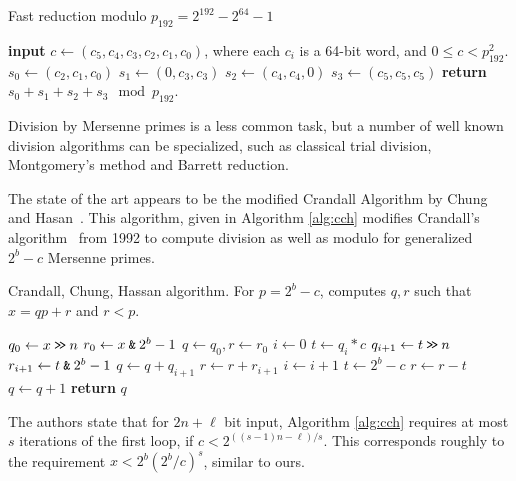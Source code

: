 \begin{algorithm}[H]
   \caption{Fast reduction modulo $p_{192} = 2^{192} - 2^{64} - 1$}
   \label{alg:solina}
   \begin{algorithmic}
      \State \textbf{input} $c \gets (c_5, c_4, c_3, c_2, c_1, c_0)$, where each $c_i$ is a 64-bit word, and $0 \le c < p^2_{192}$.
      \State $s_0 \gets (c_2, c_1, c_0)$
      \State $s_1 \gets (0, c_3, c_3)$
      \State $s_2 \gets (c_4, c_4, 0)$
      \State $s_3 \gets (c_5, c_5, c_5)$
      \State \textbf{return} $s_0 + s_1 + s_2 + s_3 \mod p_{192}$.
   \end{algorithmic}
\end{algorithm}

Division by Mersenne primes is a less common task, but a number of well known division algorithms can be specialized, such as 
 classical trial division, Montgomery's method and Barrett reduction.




The state of the art appears to be the modified Crandall Algorithm by Chung and Hasan~\cite{chung2006low}.
This algorithm, given in Algorithm \ref{alg:cch} modifies Crandall's algorithm~\cite{crandall1992method} from 1992 to compute division as well as modulo for generalized $2^b-c$ Mersenne primes.
\begin{algorithm}[H]
   \caption{Crandall, Chung, Hassan algorithm. For $p=2^b-c$, computes $q, r$ such that $x = qp+r$ and $r<p$.}
   \label{alg:cch}
   \begin{algorithmic}
         \State $q_0 \gets x \mathbin{\texttt{>\!>}} n $
         \State $r_0 \gets x \mathbin{\texttt{\&}} 2^b-1$
         \State $q \gets q_0, r\gets r_0$
         \State $i \gets 0$
            \State $t \gets q_i*c$
            \State $q_{i+1} \gets t \mathbin{\texttt{>\!>}} n$
            \State $r_{i+1} \gets t \mathbin{\texttt{\&}} {2^b -1}$
            \State $q\gets q+q_{i+1}$
            \State $r\gets r+r_{i+1}$
            \State $i\gets i+1$
         \EndWhile
         \State $t \gets 2^b-c$
            \State $r\gets r-t$
            \State $q\gets q+1$
         \EndWhile
         \State\textbf{return} $q$
   \end{algorithmic}
\end{algorithm}
The authors state that for $2n+\ell$ bit input, Algorithm \ref{alg:cch}
requires at most $s$ iterations of the first loop, if $c < 2^{((s-1)n-\ell)/s}$.
This corresponds roughly to the requirement $x < 2^b (2^b/c)^s$, similar to ours.

